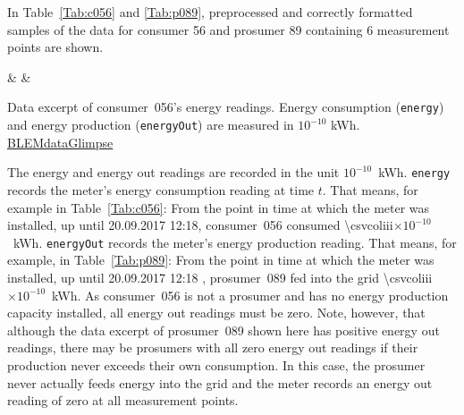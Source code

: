 In Table~\ref{Tab:c056} and \ref{Tab:p089}, preprocessed and correctly formatted samples of the data for consumer 56 and prosumer 89 containing 6 measurement points are shown.
%
\begin{table}[htbp]
    {\csvcolii & \csvcoliii & \csvcoliv}%
    \caption[Data excerpt of consumer~056's energy readings]{Data excerpt of consumer~056's energy readings. Energy consumption (\texttt{energy}) and energy production (\texttt{energyOut}) are measured in $10^{-10}$ kWh. \quantnet\href{https://github.com/QuantLet/BLEM/tree/master/BLEMdataGlimpse}{BLEMdataGlimpse}}
    \label{Tab:c056}
\end{table}
%
The energy and energy out readings are recorded in the unit $10^{-10}$~kWh. \texttt{energy} records the meter's energy consumption reading at time $t$. That means, for example in Table~\ref{Tab:c056}: From the point in time at which the meter was installed, up until 20.09.2017 12:18, consumer~056 consumed %
{\num{\csvcoliii}}$\times 10^{-10}$~kWh. \texttt{energyOut} records the meter's energy production reading. That means, for example, in Table~\ref{Tab:p089}: From the point in time at which the meter was installed, up until 20.09.2017 12:18 , prosumer~089 fed into the grid %
{\num{\csvcoliii}}$\times10^{-10}$~kWh. As consumer~056 is not a prosumer and has no energy production capacity installed, all energy out readings must be zero. Note, however, that although the data excerpt of prosumer~089 shown here has positive energy out readings, there may be prosumers with all zero energy out readings if their production never exceeds their own consumption. In this case, the prosumer never actually feeds energy into the grid and the meter records an energy out reading of zero at all measurement points.
%
